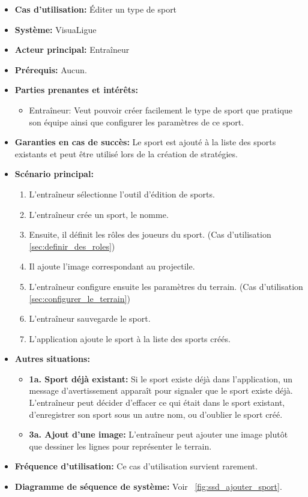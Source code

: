 \begin{itemize}
    \item \textbf{Cas d'utilisation:} Éditer un type de sport
    \item \textbf{Syst\`eme:} VisuaLigue
    \item \textbf{Acteur principal:} Entra\^ineur
    \item \textbf{Pr\'erequis:} Aucun.
    \item \textbf{Parties prenantes et int\'er\^ets:}
        \begin{itemize}
            \item Entraîneur: Veut pouvoir cr\'eer facilement le type de sport que pratique son équipe ainsi que configurer les paramètres de ce sport.
        \end{itemize}
    \item \textbf{Garanties en cas de succ\`es:} Le sport est ajout\'e \`a la liste des sports existants et peut \^etre utilisé lors de la cr\'eation de strat\'egies.
    \item \textbf{Sc\'enario principal:}
        \begin{enumerate}
            \item L'entraîneur sélectionne l'outil d'édition de sports.
            \item L'entra\^ineur cr\'ee un sport, le nomme.
            \item Ensuite, il définit les r\^oles des joueurs du sport. (Cas d'utilisation \ref{sec:definir_des_roles})
            \item Il ajoute l'image correspondant au projectile.
            \item L'entraîneur configure ensuite les paramètres du terrain. (Cas d'utilisation \ref{sec:configurer_le_terrain})
            \item L'entraîneur sauvegarde le sport.
            \item L'application ajoute le sport à la liste des sports créés.
        \end{enumerate}
    \item \textbf{Autres situations:}
        \begin{itemize}
            \item \textbf{1a. Sport d\'ej\`a existant:} Si le sport existe d\'ej\`a dans l'application, un message d'avertissement appara\^it pour signaler que le sport existe d\'ej\`a.
                L'entraîneur peut d\'ecider d'effacer ce qui \'etait dans le sport existant, d'enregistrer son sport sous un autre nom, ou d'oublier le sport cr\'e\'e.
            \item \textbf{3a. Ajout d'une image:} L'entraîneur peut ajouter une image plutôt que dessiner les lignes pour représenter le terrain.
        \end{itemize}
    \item \textbf{Fréquence d'utilisation:} Ce cas d'utilisation survient rarement.
    \item \textbf{Diagramme de s\'equence de système:} Voir ~\ref{fig:ssd_ajouter_sport}.
\end{itemize}

